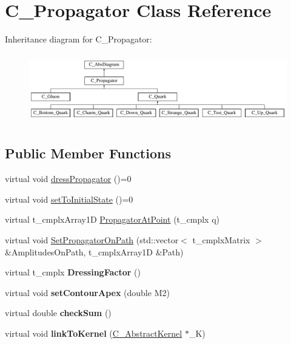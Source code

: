 \hypertarget{class_c___propagator}{\section{C\-\_\-\-Propagator Class Reference}
\label{class_c___propagator}
}
Inheritance diagram for C\-\_\-\-Propagator\-:\begin{figure}[H]
\begin{center}
\leavevmode
\includegraphics[height=3.060109cm]{class_c___propagator}
\end{center}
\end{figure}
\subsection*{Public Member Functions}
\begin{DoxyCompactItemize}
\item 
virtual void \hyperlink{class_c___propagator_a4b82db59060878e794c3590ee3fbc3f1}{dress\-Propagator} ()=0
\item 
virtual void \hyperlink{class_c___propagator_a2efb521f2afd9ad94c07f62db1d03b8b}{set\-To\-Initial\-State} ()=0
\item 
virtual t\-\_\-cmplx\-Array1\-D \hyperlink{class_c___propagator_a7bf057f408c2a30667fffea12d1375ba}{Propagator\-At\-Point} (t\-\_\-cmplx q)
\item 
virtual void \hyperlink{class_c___propagator_a47d173c63a0256ad71f41fd1cf873d4d}{Set\-Propagator\-On\-Path} (std\-::vector$<$ t\-\_\-cmplx\-Matrix $>$ \&Amplitudes\-On\-Path, t\-\_\-cmplx\-Array1\-D \&Path)
\item 
\hypertarget{class_c___propagator_a5b9292b9ec6396c95238255cb9116727}{virtual t\-\_\-cmplx {\bfseries Dressing\-Factor} ()}\label{class_c___propagator_a5b9292b9ec6396c95238255cb9116727}

\item 
\hypertarget{class_c___propagator_ac607b22d1dbb5c947606182b36acab54}{virtual void {\bfseries set\-Contour\-Apex} (double M2)}\label{class_c___propagator_ac607b22d1dbb5c947606182b36acab54}

\item 
\hypertarget{class_c___propagator_a6b49ff6bc2a98001966e987dc7d9230a}{virtual double {\bfseries check\-Sum} ()}\label{class_c___propagator_a6b49ff6bc2a98001966e987dc7d9230a}

\item 
\hypertarget{class_c___propagator_ad278336169262f85686e400feed87750}{virtual void {\bfseries link\-To\-Kernel} (\hyperlink{class_c___abstract_kernel}{C\-\_\-\-Abstract\-Kernel} $\ast$\-\_\-\-K)}\label{class_c___propagator_ad278336169262f85686e400feed87750}

\end{DoxyCompactItemize}
